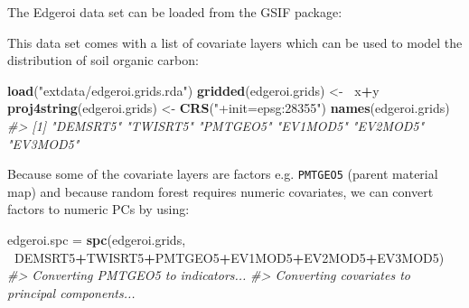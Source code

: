 \documentclass[graybox,natbib,nospthms,UStrade]{svmono}
\newenvironment{Shaded}{\begin{snugshade}}{\end{snugshade}}
\newcommand{\CommentTok}[1]{\textcolor[rgb]{0.37,0.37,0.37}{\textit{#1}}}
\newcommand{\ErrorTok}[1]{\textcolor[rgb]{0.14,0.14,0.14}{\textbf{#1}}}
\newcommand{\KeywordTok}[1]{\textcolor[rgb]{0.27,0.27,0.27}{\textbf{#1}}}
\newcommand{\NormalTok}[1]{#1}
\newcommand{\OperatorTok}[1]{\textcolor[rgb]{0.43,0.43,0.43}{\textbf{#1}}}
\newcommand{\StringTok}[1]{\textcolor[rgb]{0.5,0.5,0.5}{#1}}
\begin{document}
The Edgeroi data set can be loaded from the GSIF package:

\begin{Shaded}
\end{Shaded}

This data set comes with a list of covariate layers which can be used to model the distribution of soil organic carbon:

\begin{Shaded}
\begin{Highlighting}[]
\KeywordTok{load}\NormalTok{(}\StringTok{"extdata/edgeroi.grids.rda"}\NormalTok{)}
\KeywordTok{gridded}\NormalTok{(edgeroi.grids) <-}\StringTok{ }\ErrorTok{~}\NormalTok{x}\OperatorTok{+}\NormalTok{y}
\KeywordTok{proj4string}\NormalTok{(edgeroi.grids) <-}\StringTok{ }\KeywordTok{CRS}\NormalTok{(}\StringTok{"+init=epsg:28355"}\NormalTok{)}
\KeywordTok{names}\NormalTok{(edgeroi.grids)}
\CommentTok{#> [1] "DEMSRT5" "TWISRT5" "PMTGEO5" "EV1MOD5" "EV2MOD5" "EV3MOD5"}
\end{Highlighting}
\end{Shaded}

Because some of the covariate layers are factors e.g. \texttt{PMTGEO5} (parent material map) and because random forest requires numeric covariates, we can convert factors to numeric PCs by using:

\begin{Shaded}
\begin{Highlighting}[]
\NormalTok{edgeroi.spc =}\StringTok{ }\KeywordTok{spc}\NormalTok{(edgeroi.grids, }\OperatorTok{~}\NormalTok{DEMSRT5}\OperatorTok{+}\NormalTok{TWISRT5}\OperatorTok{+}\NormalTok{PMTGEO5}\OperatorTok{+}\NormalTok{EV1MOD5}\OperatorTok{+}\NormalTok{EV2MOD5}\OperatorTok{+}\NormalTok{EV3MOD5)}
\CommentTok{#> Converting PMTGEO5 to indicators...}
\CommentTok{#> Converting covariates to principal components...}
\end{Highlighting}
\end{Shaded}
\end{document}

